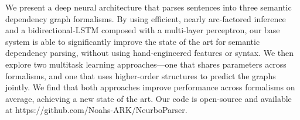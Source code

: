 We present a deep neural architecture that parses sentences into three semantic dependency graph formalisms. By using efficient, nearly arc-factored inference and a bidirectional-LSTM composed with a multi-layer perceptron,  our base system is able to significantly improve the state of the art for semantic dependency parsing, without using hand-engineered features or syntax. We then explore two multitask learning approaches---one that shares parameters across formalisms, and one that uses higher-order structures to predict the graphs jointly. We find that both approaches improve performance across formalisms on average, achieving a new state of the art. Our code is open-source and available at https://github.com/Noahs-ARK/NeurboParser.
